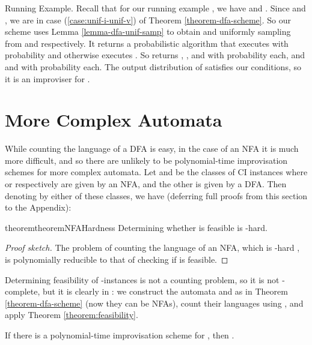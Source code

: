 \documentclass[a4paper,USenglish,numberwithinsect]{lipics}
\theoremstyle{plain}
\theoremstyle{definition}
\begin{document}
\begin{subparagraph}{Running Example.}
Recall that for our running example , we have  and . 
Since  and , we are in case (\ref{case:unif-i-unif-v}) of Theorem \ref{theorem-dfa-scheme}.
So our scheme uses Lemma \ref{lemma-dfa-unif-samp} to obtain  and  uniformly sampling from  and  respectively.
It returns a probabilistic algorithm  that executes  with probability  and otherwise executes .
So  returns , , and  with probability  each, and  and  with probability  each.
The output distribution of  satisfies our conditions, so it is an improviser for .
\end{subparagraph}

\section{More Complex Automata} \label{section:complex-automata}

While counting the language of a DFA is easy, in the case of an NFA it
is much more difficult, and so there are unlikely to be
polynomial-time improvisation schemes for more complex automata. Let
 and  be the classes of CI instances
where  or  respectively are given by an
NFA, and the other is given by a DFA. Then denoting by  
either of these classes, we have (deferring full proofs from this section to the Appendix): 

\begin{restatable}{theorem}{theoremNFAHardness} \label{theorem:nfa-hardness}
Determining whether  is feasible is -hard.
\end{restatable}
\begin{proof}[Proof sketch]
The problem of counting the language of an NFA, which is
-hard \cite{sharpNFA}, is polynomially reducible to that of
checking if  is feasible.
\end{proof}
\begin{remark}
Determining feasibility of -instances is not a counting
problem, so it is not -complete, but it is clearly in
: we construct the automata  and
 as in Theorem \ref{theorem-dfa-scheme} (now they
can be NFAs), count their languages using , and apply Theorem
\ref{theorem:feasibility}. 
\end{remark}

\begin{corollary}
If there is a polynomial-time improvisation scheme for , then .
\end{corollary}
\end{document}
